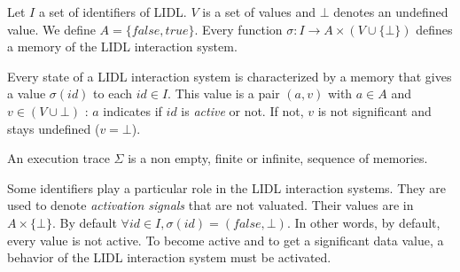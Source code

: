 \begin{definition}[Memory]
Let $I$ a set of identifiers of LIDL. $V$ is a set of values and
$\bot$ denotes an undefined value. We define $A = \{false,true\}$.
Every function $\sigma : I \rightarrow A \times (V \cup \{\bot\})$ defines a
memory of the LIDL interaction system.
\end{definition}
Every state of a LIDL interaction system is characterized by a
memory that gives a  value $\sigma(id)$ to each $id \in I$. This
value is a pair $(a,v)$ with $ a \in A$ and $v \in (V \cup
\bot)$ : $a$ indicates if $id$ is \textit{active} or not. If not, $v$ is
not significant and stays undefined ($v = \bot$). 
\begin{definition}[Trace]
An execution trace $\Sigma$ is a non empty, finite or infinite,
sequence of memories.
\end{definition} 
Some  identifiers  play a  particular  role  in the  LIDL  interaction
systems.  They are used to denote \textit{activation signals} that are
not valuated.  Their values are in $A \times \{\bot\}$.  By default
$\forall id  \in I,  \sigma(id) = (false,\bot)$.   In other  words, by
default, every value is not  active. To become  active and to  get a
significant data value, a behavior of the LIDL interaction system must be
activated.

